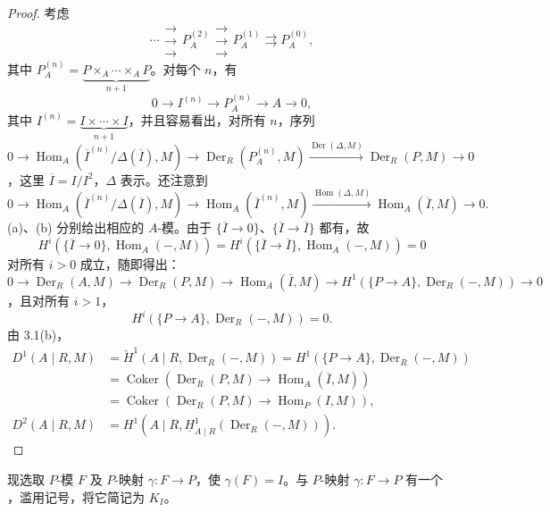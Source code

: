 \begin{proof}
考虑
\[\cdots\mathrel{\substack{\longrightarrow\\[-.8ex]\longrightarrow\\[-.8ex]\longrightarrow}}P_A^{(2)}\mathrel{\substack{\longrightarrow\\[-.8ex]\longrightarrow\\[-.8ex]\longrightarrow}}P_A^{(1)}\rightrightarrows P_A^{(0)},\tag{*}\]
其中 $P_A^{(n)}=\underbrace{P\mathbin{\times_A}\cdots\mathbin{\times_A}P}_{n+1}$。对每个 $n$，有
\[0\to I^{(n)}\to P_A^{(n)}\to A\to0,\]
其中 $I^{(n)}=\underbrace{I\times\cdots\times I}_{n+1}$，并且容易看出，对所有 $n$，序列
\[0\to\operatorname{Hom}_A(\overline I^{(n)}/\Delta(\overline I),M)\to\operatorname{Der}_R(P_A^{(n)},M)\xrightarrow{\operatorname{Der}(\Delta,M)}\operatorname{Der}_R(P,M)\to0\tag{a}\]
，这里 $\overline I=I/I^2$，$\Delta$ 表示。还注意到
\[0\to\operatorname{Hom}_A(\overline I^{(n)}/\Delta(\overline I),M)\to\operatorname{Hom}_A(\overline I^{(n)},M)\xrightarrow{\operatorname{Hom}(\Delta,M)}\operatorname{Hom}_A(\overline I,M)\to0.\tag{b}\]
 (a)、(b) 分别给出相应的 $A$-模。由于 $\{\overline I\to0\}$、$\{\overline I\to\overline I\}$ 都有，故
\[H^i(\{\overline I\to0\},\operatorname{Hom}_A(-,M))=H^i(\{\overline I\to\overline I\},\operatorname{Hom}_A(-,M))=0\]
对所有 $i>0$ 成立，随即得出：
\[0\to\operatorname{Der}_R(A,M)\to\operatorname{Der}_R(P,M)\to\operatorname{Hom}_A(\overline I,M)\to H^1(\{P\to A\},\operatorname{Der}_R(-,M))\to0\]
，且对所有 $i>1$，
\[H^i(\{P\to A\},\operatorname{Der}_R(-,M))=0.\]
由 3.1(b)，
\[
\begin{aligned}
D^1(A\mid R,M)&=\check H^1(A\mid R,\operatorname{Der}_R(-,M))
=H^1(\{P\to A\},\operatorname{Der}_R(-,M))\\
&=\operatorname{Coker}(\operatorname{Der}_R(P,M)\to\operatorname{Hom}_A(\overline I,M))\\
&=\operatorname{Coker}(\operatorname{Der}_R(P,M)\to\operatorname{Hom}_P(I,M)),\\
D^2(A\mid R,M)&=H^1(A\mid R,\underline H^1_{A\mid R}(\operatorname{Der}_R(-,M))).
\end{aligned}
\]
\end{proof}
现选取 $P$-模 $F$ 及 $P$-映射 $\gamma:F\to P$，使 $\gamma(F)=I$。与 $P$-映射 $\gamma:F\to P$ 有一个 ，滥用记号，将它简记为 $K_I$。

